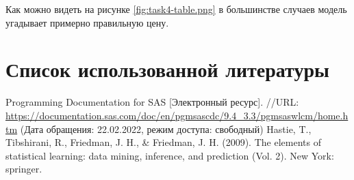 \documentclass[12pt,a4paper]{article}
\begin{document}
  Как можно видеть на рисунке \ref{fig:task4-table.png} в большинстве случаев модель угадывает примерно правильную цену.

  \newpage
  \section{Список использованной литературы}
  \begin{thebibliography}{3}
     Programming Documentation for SAS [Электронный ресурс].
      //URL: \url{https://documentation.sas.com/doc/en/pgmsascdc/9.4_3.3/pgmsaswlcm/home.htm}
      (Дата обращения: 22.02.2022, режим доступа: свободный)
     Hastie, T., Tibshirani, R., Friedman, J. H., \& Friedman, J. H. (2009). The elements of statistical learning: data mining, inference, and prediction (Vol. 2). New York: springer.
  \end{thebibliography}
\end{document}
